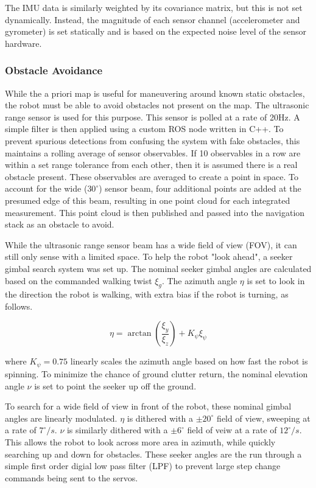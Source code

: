 The IMU data is similarly weighted by its covariance matrix, but this is not set dynamically. Instead, the magnitude of each sensor channel (accelerometer and gyrometer) is set statically and is based on the expected noise level of the sensor hardware.

\subsubsection{ Obstacle Avoidance }

While the a priori map is useful for maneuvering around known static obstacles, the robot must be able to avoid obstacles not present on the map. The ultrasonic range sensor is used for this purpose. This sensor is polled at a rate of 20Hz. A simple filter is then applied using a custom ROS node written in C++. To prevent spurious detections from confusing the system with fake obstacles, this maintains a rolling average of sensor observables. If 10 observables in a row are within a set range tolerance from each other, then it is assumed there is a real obstacle present. These observables are averaged to create a point in space. To account for the wide ($30^{\circ}$) sensor beam, four additional points are added at the presumed edge of this beam, resulting in one point cloud for each integrated measurement. This point cloud is then published and passed into the navigation stack as an obstacle to avoid.

While the ultrasonic range sensor beam has a wide field of view (FOV), it can still only sense with a limited space. To help the robot "look ahead", a seeker gimbal search system was set up. The nominal seeker gimbal angles are calculated based on the commanded walking twist $\xi_g$. The azimuth angle $\eta$ is set to look in the direction the robot is walking, with extra bias if the robot is turning, as follows.

\begin{equation}
    \eta = \arctan( \frac{ \xi_y }{\xi_z} ) + K_{\psi} \xi_{\psi}
\end{equation}

where $K_{\psi}=0.75$ linearly scales the azimuth angle based on how fast the robot is spinning. To minimize the chance of ground clutter return, the nominal elevation angle $\nu$ is set to point the seeker up off the ground. 

To search for a wide field of view in front of the robot, these nominal gimbal angles are linearly modulated. $\eta$ is dithered with a $\pm 20^{\circ}$ field of view, sweeping at a rate of $7^{\circ}/s$. $\nu$ is similarly dithered with a $\pm 6^{\circ}$ field of veiw at a rate of $12^{\circ}/s$. This allows the robot to look across more area in azimuth, while quickly searching up and down for obstacles. These seeker angles are the run through a simple first order digial low pass filter (LPF) to prevent large step change commands being sent to the servos. 

